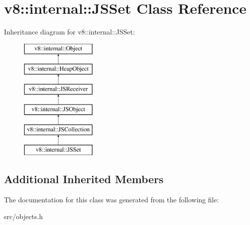 \hypertarget{classv8_1_1internal_1_1_j_s_set}{}\section{v8\+:\+:internal\+:\+:J\+S\+Set Class Reference}
\label{classv8_1_1internal_1_1_j_s_set}
Inheritance diagram for v8\+:\+:internal\+:\+:J\+S\+Set\+:\begin{figure}[H]
\begin{center}
\leavevmode
\includegraphics[height=6.000000cm]{classv8_1_1internal_1_1_j_s_set}
\end{center}
\end{figure}
\subsection*{Additional Inherited Members}


The documentation for this class was generated from the following file\+:\begin{DoxyCompactItemize}
\item 
src/objects.\+h\end{DoxyCompactItemize}

